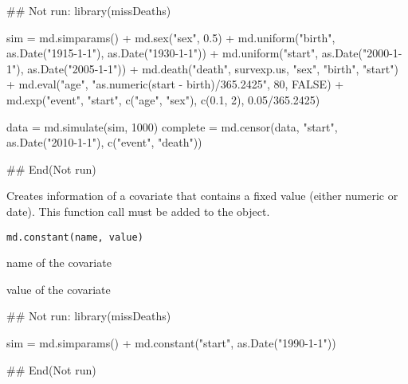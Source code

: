 \documentclass[a4paper]{book}
\begin{document}
\begin{Examples}
\begin{ExampleCode}

## Not run: 
library(missDeaths)

sim = md.simparams() +
  md.sex("sex", 0.5) + 
    md.uniform("birth", as.Date("1915-1-1"), as.Date("1930-1-1")) +
      md.uniform("start", as.Date("2000-1-1"), as.Date("2005-1-1")) +
        md.death("death", survexp.us, "sex", "birth", "start") +
          md.eval("age", "as.numeric(start - birth)/365.2425", 80, FALSE) + 
            md.exp("event", "start", c("age", "sex"), c(0.1, 2), 0.05/365.2425)
            
data = md.simulate(sim, 1000)
complete = md.censor(data, "start", as.Date("2010-1-1"), c("event", "death"))

## End(Not run)

\end{ExampleCode}
\end{Examples}
%
\begin{Description}\relax
Creates information of a covariate that contains a fixed value (either numeric or date).
This function call must be added to the  object.
\end{Description}
%
\begin{Usage}
\begin{verbatim}
md.constant(name, value)
\end{verbatim}
\end{Usage}
%
\begin{Arguments}
\begin{ldescription}
\item[\code{name}] name of the covariate

\item[\code{value}] value of the covariate
\end{ldescription}
\end{Arguments}
%
\begin{Examples}
\begin{ExampleCode}

## Not run: 
library(missDeaths)

sim = md.simparams() +
   md.constant("start", as.Date("1990-1-1")) 

## End(Not run)
\end{ExampleCode}
\end{Examples}
\end{document}
